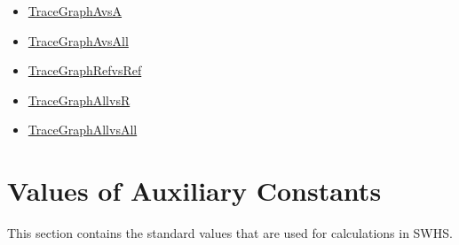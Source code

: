 \documentclass[12pt]{article}
\begin{document}
\begin{itemize}
\item{\hyperref{../../../../traceygraphs/swhs/avsa.svg}{}{}{TraceGraphAvsA}}
\item{\hyperref{../../../../traceygraphs/swhs/avsall.svg}{}{}{TraceGraphAvsAll}}
\item{\hyperref{../../../../traceygraphs/swhs/refvsref.svg}{}{}{TraceGraphRefvsRef}}
\item{\hyperref{../../../../traceygraphs/swhs/allvsr.svg}{}{}{TraceGraphAllvsR}}
\item{\hyperref{../../../../traceygraphs/swhs/allvsall.svg}{}{}{TraceGraphAllvsAll}}
\end{itemize}
\section{Values of Auxiliary Constants}
\label{Sec:AuxConstants}
This section contains the standard values that are used for calculations in SWHS.
\end{document}
